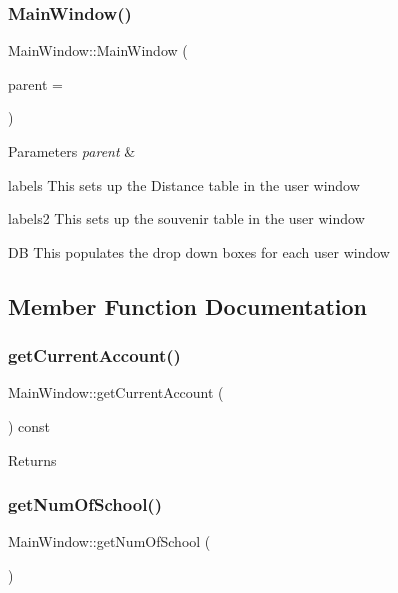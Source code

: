 \subsubsection{\texorpdfstring{Main\+Window()}{MainWindow()}}
{\footnotesize\ttfamily Main\+Window\+::\+Main\+Window (\begin{DoxyParamCaption}\item[{Q\+Widget $\ast$}]{parent = {} }\end{DoxyParamCaption})\hspace{0.3cm}{\ttfamily [explicit]}}


\begin{DoxyParams}{Parameters}
{\em parent} & \\
\hline
\end{DoxyParams}
labels This sets up the Distance table in the user window

labels2 This sets up the souvenir table in the user window

DB This populates the drop down boxes for each user window 

\subsection{Member Function Documentation}
\mbox{\label{class_main_window_afe94673b54307c640ed99688ede216df}} 
\subsubsection{\texorpdfstring{get\+Current\+Account()}{getCurrentAccount()}}
{\footnotesize\ttfamily Main\+Window\+::get\+Current\+Account (\begin{DoxyParamCaption}{ }\end{DoxyParamCaption}) const}

\begin{DoxyReturn}{Returns}

\end{DoxyReturn}
\mbox{\label{class_main_window_a7eb46310d227cc49d08fc2b5874eb308}} 
\subsubsection{\texorpdfstring{get\+Num\+Of\+School()}{getNumOfSchool()}}
{\footnotesize\ttfamily Main\+Window\+::get\+Num\+Of\+School (\begin{DoxyParamCaption}{ }\end{DoxyParamCaption})}

